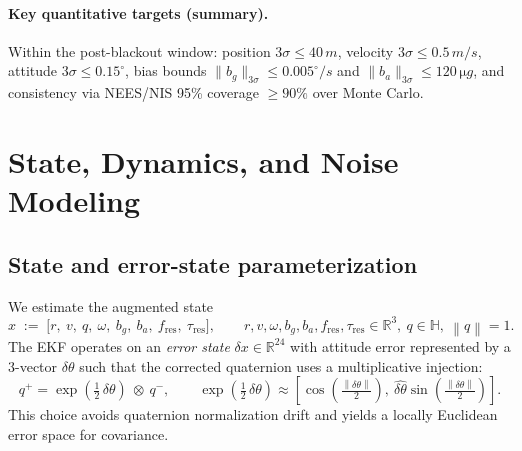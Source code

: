 \documentclass[10pt]{article}
\newcommand{\R}{\mathbb{R}}
\newcommand{\norm}[1]{\left\lVert #1 \right\rVert}
\newcommand{\defeq}{\mathrel{:=}}
\begin{document}
\paragraph{Key quantitative targets (summary).}
Within the post-blackout window:
position $3\sigma \le 40\,\si{m}$, velocity $3\sigma \le 0.5\,\si{m/s}$,
attitude $3\sigma \le 0.15^{\circ}$,
bias bounds $\|b_g\|_{3\sigma} \le 0.005^{\circ}/\si{s}$ and $\|b_a\|_{3\sigma} \le 120\,\si{\micro g}$,
and consistency via NEES/NIS 95\% coverage $\ge 90\%$ over Monte Carlo.

\section{State, Dynamics, and Noise Modeling}
\subsection{State and error-state parameterization}
We estimate the augmented state
\begin{equation}
  x \;\defeq\; \big[r,\ v,\ q,\ \omega,\ b_g,\ b_a,\ f_{\text{res}},\ \tau_{\text{res}}\big],
  \qquad r,v,\omega,b_g,b_a,f_{\text{res}},\tau_{\text{res}}\in\R^3,\ q\in\mathbb{H},\ \norm{q}=1.
\end{equation}
The EKF operates on an \emph{error state} $\delta x \in \R^{24}$ with attitude error represented by a 3-vector $\delta\theta$
such that the corrected quaternion uses a multiplicative injection:
\begin{equation}
  q^{+} = \exp(\tfrac{1}{2}\,\delta\theta)\ \otimes\ q^{-},
  \qquad \exp(\tfrac{1}{2}\,\delta\theta) \approx \left[\cos(\tfrac{\norm{\delta\theta}}{2}),\ \hat{\delta\theta}\sin(\tfrac{\norm{\delta\theta}}{2})\right].
\end{equation}
This choice avoids quaternion normalization drift and yields a locally Euclidean error space for covariance.
\end{document}
